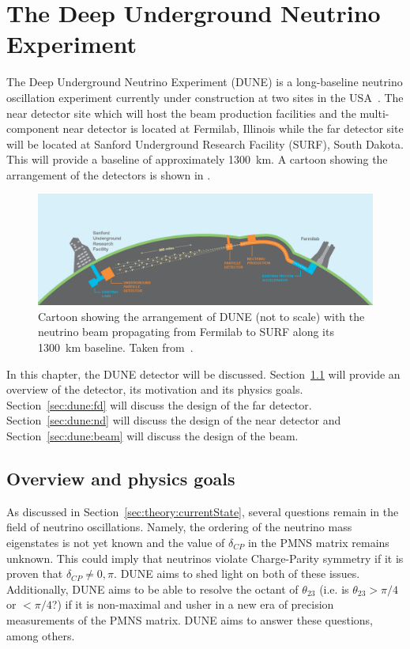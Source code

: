 \chapter{The Deep Underground Neutrino Experiment}
\label{ch:dune}

The Deep Underground Neutrino Experiment (DUNE) is a long-baseline neutrino oscillation experiment currently under construction at two sites in the USA~\cite{tdrVol1, tdrVol2, tdrVol3, tdrVol4}.
The near detector site which will host the beam production facilities and the multi-component near detector is located at Fermilab, Illinois while the far detector site will be located at Sanford Underground Research Facility (SURF), South Dakota.
This will provide a baseline of approximately 1300~km.
A cartoon showing the arrangement of the detectors is shown in .

\begin{figure}[h]
  \centering
  \includegraphics[width=.9\linewidth]{files/figures/dune_detector/duneCartoon}
  \caption[Cartoon of DUNE.]{Cartoon showing the arrangement of DUNE (not to scale) with the neutrino beam propagating from Fermilab to SURF along its 1300~km baseline. Taken from~\cite{tdrVol1}.}
  \label{fig:duneCartoon}
\end{figure}

In this chapter, the DUNE detector will be discussed.
Section~\ref{sec:dune:overview} will provide an overview of the detector, its motivation and its physics goals.
Section~\ref{sec:dune:fd} will discuss the design of the far detector.
Section~\ref{sec:dune:nd} will discuss the design of the near detector and Section~\ref{sec:dune:beam} will discuss the design of the beam.

\section{Overview and physics goals}
\label{sec:dune:overview}
As discussed in Section~\ref{sec:theory:currentState}, several questions remain in the field of neutrino oscillations.
Namely, the ordering of the neutrino mass eigenstates is not yet known and the value of $\delta_{CP}$ in the PMNS matrix remains unknown.
This could imply that neutrinos violate Charge-Parity symmetry if it is proven that $\delta_{CP} \neq 0, \pi$.
DUNE aims to shed light on both of these issues.
Additionally, DUNE aims to be able to resolve the octant of $\theta_{23}$ (i.e. is $\theta_{23} > \pi/4$ or $< \pi/4$?) if it is non-maximal and usher in a new era of precision measurements of the PMNS matrix. 
DUNE aims to answer these questions, among others.

